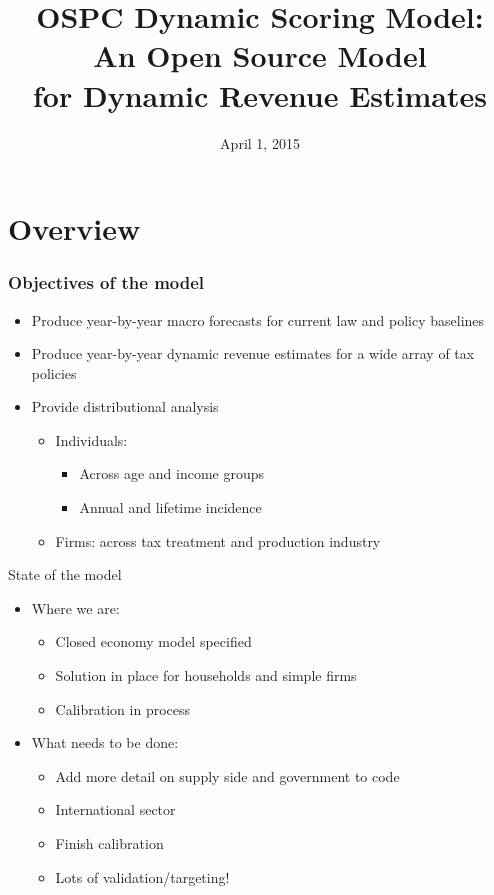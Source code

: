 \documentclass{beamer}
\title[OSPC Dynamic Scoring Model]
{OSPC Dynamic Scoring Model: \\
An Open Source Model \\ for Dynamic Revenue Estimates}
\date[Short Occasion] %
{April 1, 2015}
\begin{document}
\begin{frame}
  \titlepage
\end{frame}


\section{Overview}

\begin{frame}
\frametitle{Objectives of the model}
\begin{itemize}
\item Produce year-by-year macro forecasts for current law and policy baselines
\item Produce year-by-year dynamic revenue estimates for a wide array of tax policies
\item Provide distributional analysis
	\begin{itemize}
	\item Individuals: 
		\begin{itemize}
		\item Across age and income groups
		\item Annual and lifetime incidence 
		\end{itemize}
	\item Firms: across tax treatment and production industry 
	\end{itemize}
\end{itemize}
\end{frame}

    \begin{frame}{State of the model}
  \begin{itemize}
  \item Where we are:
  	\begin{itemize}
      	\item Closed economy model specified
	\item Solution in place for households and simple firms
      	\item Calibration in process
  	\end{itemize}
 \item What needs to be done:
 	\begin{itemize}
	\item Add more detail on supply side and government to code
	\item International sector
	\item Finish calibration
	\item Lots of validation/targeting!
	\end{itemize}
 \end{itemize}
  \end{frame}
  
\end{document}
